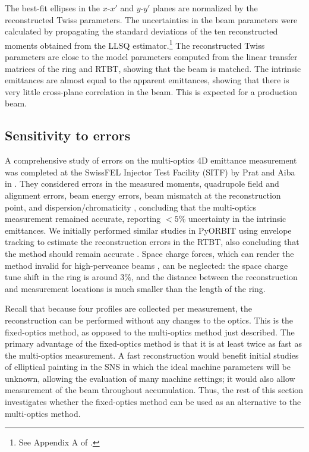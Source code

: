%
The best-fit ellipses in the $x$-$x'$ and $y$-$y'$ planes are normalized by the reconstructed Twiss parameters. The uncertainties in the beam parameters were calculated by propagating the standard deviations of the ten reconstructed moments obtained from the LLSQ estimator.\footnote{See Appendix A of \cite{Faus-Golfe2016}.} The reconstructed Twiss parameters are close to the model parameters computed from the linear transfer matrices of the ring and RTBT, showing that the beam is matched. The intrinsic emittances are almost equal to the apparent emittances, showing that there is very little cross-plane correlation in the beam. This is expected for a production beam.



\subsection{Sensitivity to errors}

A comprehensive study of errors on the multi-optics 4D emittance measurement was completed at the SwissFEL Injector Test Facility (SITF) by Prat and Aiba in \cite{Prat2014}. They considered errors in the measured moments, quadrupole field and alignment errors, beam energy errors, beam mismatch at the reconstruction point, and dispersion/chromaticity \cite{Mostacci2012}, concluding that the multi-optics measurement remained accurate, reporting $< 5\%$ uncertainty in the intrinsic emittances. We initially performed similar studies in PyORBIT using envelope tracking to estimate the reconstruction errors in the RTBT, also concluding that the method should remain accurate \cite{Hoover2021-IPAC}. Space charge forces, which can render the method invalid for high-perveance beams \cite{Anderson2002}, can be neglected: the space charge tune shift in the ring is around 3\%, and the distance between the reconstruction and measurement locations is much smaller than the length of the ring. 

Recall that because four profiles are collected per measurement, the reconstruction can be performed without any changes to the optics. This is the fixed-optics method, as opposed to the multi-optics method just described. The primary advantage of the fixed-optics method is that it is at least twice as fast as the multi-optics measurement. A fast reconstruction would benefit initial studies of elliptical painting in the SNS in which the ideal machine parameters will be unknown, allowing the evaluation of many machine settings; it would also allow measurement of the beam throughout accumulation. Thus, the rest of this section investigates whether the fixed-optics method can be used as an alternative to the multi-optics method.

